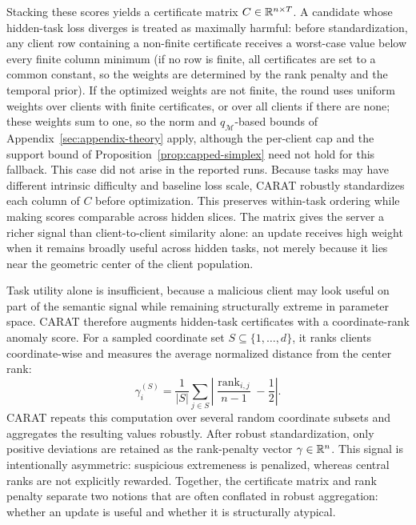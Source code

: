 Stacking these scores yields a certificate matrix $C \in \mathbb{R}^{n \times T}$. A candidate whose hidden-task loss diverges is treated as maximally harmful: before standardization, any client row containing a non-finite certificate receives a worst-case value below every finite column minimum (if no row is finite, all certificates are set to a common constant, so the weights are determined by the rank penalty and the temporal prior). If the optimized weights are not finite, the round uses uniform weights over clients with finite certificates, or over all clients if there are none; these weights sum to one, so the norm and $q_{\mathcal{M}}$-based bounds of Appendix~\ref{sec:appendix-theory} apply, although the per-client cap and the support bound of Proposition~\ref{prop:capped-simplex} need not hold for this fallback. This case did not arise in the reported runs. Because tasks may have different intrinsic difficulty and baseline loss scale, CARAT robustly standardizes each column of $C$ before optimization. This preserves within-task ordering while making scores comparable across hidden slices. The matrix gives the server a richer signal than client-to-client similarity alone: an update receives high weight when it remains broadly useful across hidden tasks, not merely because it lies near the geometric center of the client population.

Task utility alone is insufficient, because a malicious client may look useful on part of the semantic signal while remaining structurally extreme in parameter space. CARAT therefore augments hidden-task certificates with a coordinate-rank anomaly score. For a sampled coordinate set $S \subseteq \{1,\dots,d\}$, it ranks clients coordinate-wise and measures the average normalized distance from the center rank:
\begin{equation}
\gamma_i^{(S)} = \frac{1}{|S|}\sum_{j \in S}
\left|
\frac{\operatorname{rank}_{i,j}}{n-1} - \frac{1}{2}
\right|.
\label{eq:rank}
\end{equation}
CARAT repeats this computation over several random coordinate subsets and aggregates the resulting values robustly. After robust standardization, only positive deviations are retained as the rank-penalty vector $\gamma\in\mathbb{R}^n$. This signal is intentionally asymmetric: suspicious extremeness is penalized, whereas central ranks are not explicitly rewarded. Together, the certificate matrix and rank penalty separate two notions that are often conflated in robust aggregation: whether an update is useful and whether it is structurally atypical.

